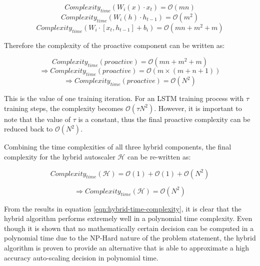 \[Complexity_{time}(W_{i}(x) \cdot x_{t}) = \mathcal{O}(mn)\]
\[Complexity_{time}(W_{i}(h) \cdot h_{t-1}) = \mathcal{O}(m^2)\]
\begin{equation}
    Complexity_{time}(W_{i} \cdot [x_{t}, h_{t-1}] + b_{i}) = \mathcal{O}(mn + m^2 + m)
\end{equation}

Therefore the complexity of the proactive component can be written as:

\[Complexity_{time}(proactive) = \mathcal{O}(mn + m^2 + m)\]
\[\Rightarrow Complexity_{time}(proactive) = \mathcal{O}(m \times (m + n + 1))\]
\begin{equation}
    \Rightarrow Complexity_{time}(proactive) = \mathcal{O}(N^2)
\end{equation}

This is the value of one training iteration. For an LSTM training process with $\tau$ training steps, the complexity becomes $\mathcal{O}(\tau N^2)$. However, it is important to note that the value of $\tau$ is a constant, thus the final proactive complexity can be reduced back to $\mathcal{O}(N^2)$.\par

Combining the time complexities of all three hybrid components, the final complexity for the hybrid autoscaler $\mathcal{H}$ can be re-written as:

\[Complexity_{time}(\mathcal{H}) = \mathcal{O}(1) +  \mathcal{O}(1) + \mathcal{O}(N^2)\]

\begin{equation}
    \label{eqn:hybrid-time-complexity}
    \Rightarrow Complexity_{time}(\mathcal{H}) = \mathcal{O}(N^2)
\end{equation}

From the results in equation \ref{eqn:hybrid-time-complexity}, it is clear that the hybrid algorithm performs extremely well in a polynomial time complexity. Even though it is shown that no mathematically certain decision can be computed in a polynomial time due to the NP-Hard nature of the problem statement, the hybrid algorithm is proven to provide an alternative that is able to approximate a high accuracy auto-scaling decision in polynomial time.